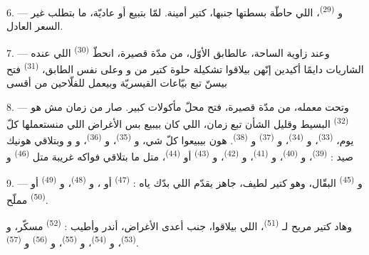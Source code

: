 6. --- و \textsuperscript{(29)}، اللي حاطّة
بسطتها جنبها، كتير أمينة. لمّا بتبيع 
أو  عاديّة، ما بتطلب غير السعر العادل.

7. --- وعند زاوية الساحة، عالطابق الأوّل، من مدّة قصيرة، انحطّ
 \textsuperscript{(30)} اللي عنده الشاريات دايمًا
أكيدين إنّهن بيلاقوا تشكيلة حلوة كتير من  و وعلى نفس الطابق، 
\textsuperscript{(31)} فتح  بيسنّ  تبع
بيّاعات القيسريّة وبيعمل للفلّاحين  من أقسى

\VUsaut{4.0mm}
\VUsaut{3.0mm}

8. --- وتحت معمله، من مدّة قصيرة، فتح محلّ مأكولات كبير. صار من زمان
مش هو  \textsuperscript{(32)} البسيط وقليل الشأن
تبع زمان، اللي كان بيبيع بس الأغراض اللي منستعملها كلّ يوم،
 \textsuperscript{(33)}، و
\textsuperscript{(34)}، و \textsuperscript{(37)}
و \textsuperscript{(38)}. هون بيبيعوا كلّ شي،
 و \textsuperscript{(35)}،
و \textsuperscript{(36)}، و و وبتلاقي هونيك صيد :
 \textsuperscript{(39)}، و
\textsuperscript{(40)}، و \textsuperscript{(41)}،
و \textsuperscript{(42)}، و
\textsuperscript{(43)} أو  \textsuperscript{(44)}، متل ما
بتلاقي فواكه غريبة متل  \textsuperscript{(46)}
و

9. --- و \textsuperscript{(45)} البقّال، وهو كتير لطيف،
جاهز يقدّم اللي بدّك ياه :  \textsuperscript{(47)}
 أو ، و \textsuperscript{(48)}،
و \textsuperscript{(49)} أو 
\textsuperscript{(50)} مملّح.

وهاد كتير مريح لـ \textsuperscript{(51)}، اللي
بيلاقوا، جنب أعدى الأغراض، أندر  وأطيب
 :  \textsuperscript{(52)} مسكّر،
و \textsuperscript{(53)}، و \textsuperscript{(54)}،
و \textsuperscript{(55)}، و \textsuperscript{(56)}
و \textsuperscript{(57)}.

\VUsaut{4.0mm}
\VUsaut{3.0mm}

